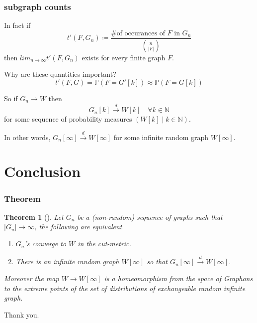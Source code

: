 \documentclass{beamer}
\newcommand\N{\mathbb{N}}
\newtheorem{thm}{Theorem}[section]
\begin{document}
  \begin{frame}
    \frametitle{subgraph counts}
    In fact if
    \begin{equation*}
      t'(F, G_n) \coloneqq \frac{\text{\# of occurances of }  F \text{ in } G_n}{\binom{n}{|F|}} 
    \end{equation*}
    then $lim_{n \to \infty} t'(F, G_n)$ exists for every finite graph $F$.
    
    \begin{block}{Why are these quantities important?}
    \pause
    \begin{equation*}
      t'(F, G) = \mathbb{P}(F = G'[k]) \approx \mathbb{P}(F = G[k])
    \end{equation*}
    \end{block}

    So if $G_n \to W$ then 
    \pause
    \begin{equation*}
      G_n[k] \xrightarrow{d} W[k] \quad \forall k \in \N
    \end{equation*}
    for some sequence of probability measures $\left( W[k] \mid k \in \N \right)$. 

    \pause
    In other words, \alert{$G_n[\infty] \xrightarrow{d} W[\infty]$} for some infinite random graph $W[\infty]$.
    
  \end{frame}

  \section{Conclusion}
  \begin{frame}
    \frametitle{Theorem}
    \begin{thm}[\cite{paper}]
      Let $G_n$ be a (non-random) sequence of graphs such that $|G_n| \to \infty$, the following are equivalent
      \begin{enumerate}
	\item $G_n$'s converge to $W$ in the cut-metric.
	\item There is an infinite random graph $W[\infty]$ so that $G_n[\infty] \xrightarrow{d} W[\infty]$.
      \end{enumerate}
      Moreover the map $W \to W[\infty]$ is a homeomorphism from the space of Graphons to the extreme points of the set of distributions of exchangeable random infinite graph.
    \end{thm}

    \printbibliography
\end{frame}
\begin{frame}
  Thank you.
\end{frame}

\end{document}

